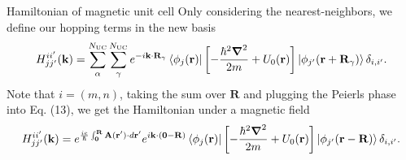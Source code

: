 \documentclass[aspectratio=169,compress,x11names]{beamer}
\begin{document}
	\begin{frame}{Hamiltonian of magnetic unit cell}
		Only considering the nearest-neighbors, we define our hopping terms in the new basis
		\begin{gather}
			H_{jj'}^{ii'}(\mathbf{k}) = \sum_{{\alpha}}^{N_\text{UC}}\sum_{{\gamma}}^{N_\text{UC}} e^{-i \mathbf{k}\cdot \mathbf{R}_{\gamma}} \bra{\phi_{j}(\mathbf{r})} \left[-\frac{\hbar^{2} \boldsymbol{\nabla}^{2}}{2m} + U_{0}(\mathbf{r})\right] \ket{\phi_{j'}(\mathbf{r}+\mathbf{R}_{\gamma})}\delta_{i,i'}.
		\end{gather}
		Note that $i=(m,n)$, taking the sum over $\mathbf{R}$ and plugging the Peierls phase into Eq. (13), we get the Hamiltonian under a magnetic field
		\begin{gather}
			H_{jj'}^{ii'}(\mathbf{k})
			= e^{\frac{ie}{\hbar} \int_{\mathbf{0}}^{\mathbf{R}}\mathbf{A}(\mathbf{r}')\cdot d\mathbf{r}'}e^{i\mathbf{k} \cdot (\mathbf{0} - \mathbf{R})} \bra{\phi_{j}(\mathbf{r})} \left[-\frac{\hbar^{2} \boldsymbol{\nabla}^{2}}{2m} + U_{0}(\mathbf{r})\right] \ket{\phi_{j'}(\mathbf{r} - \mathbf{R})}\delta_{i,i'} .
		\end{gather}
	\end{frame}
\end{document}
